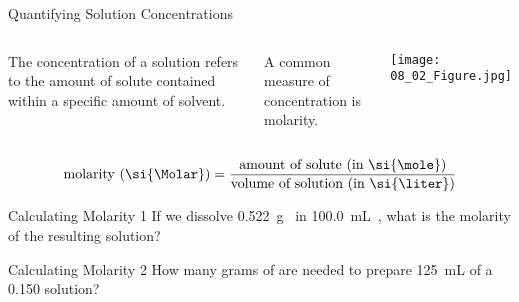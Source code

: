 \documentclass[11pt,letterpaper]{article}
\begin{document}
\begin{frame}{Quantifying Solution Concentrations}
	\begin{columns}
		The \alert{concentration} of a solution refers to the amount of solute
		contained within
		a specific amount of solvent.
	
		\bigskip
	
		A common measure of concentration is \alert{molarity}.
		\begin{center}
			\texttt{[image: 08\_02\_Figure.jpg]}
		\end{center}
	\end{columns}

	\bigskip

	\begin{equation*}
		\text{molarity (\si{\Molar})} = \frac{\text{amount of solute (in
		\si{\mole})}}{\text{volume of solution (in \si{\liter})}}
	\end{equation*}
\end{frame}

\begin{frame}[t]{Calculating Molarity 1}
	If we dissolve \SI{0.522}{\gram}~ in
	\SI{100.0}{\milli\liter}~, what is the molarity of the resulting
	solution?

	\vspace{10em}

\end{frame}

\begin{frame}[t]{Calculating Molarity 2}
	How many grams of  are needed to prepare
	\SI{125}{\milli\liter} of a \SI{0.150}{\Molar} solution?

	\vspace{10em}

\end{frame}
\end{document}
